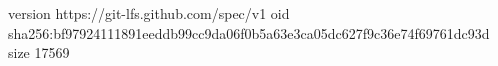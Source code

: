 version https://git-lfs.github.com/spec/v1
oid sha256:bf97924111891eeddb99cc9da06f0b5a63e3ca05dc627f9c36e74f69761dc93d
size 17569
